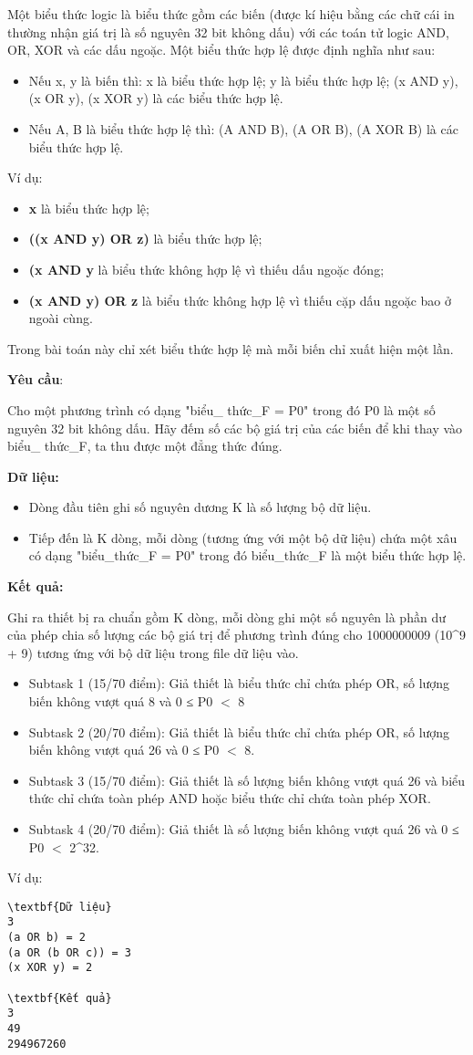 

Một biểu thức logic là biểu thức gồm các biến (được kí hiệu bằng các chữ cái in thường nhận giá trị là số nguyên 32 bit không dấu) với các toán tử logic AND, OR, XOR và các dấu ngoặc. Một biểu thức hợp lệ được định nghĩa như sau:
\begin{itemize}
	\item Nếu x, y là biến thì: x là biểu thức hợp lệ; y là biểu thức hợp lệ; (x AND y), (x OR y), (x XOR y) là các biểu thức hợp lệ.
	\item Nếu A, B là biểu thức hợp lệ thì: (A AND B), (A OR B), (A XOR B) là các biểu thức hợp lệ.
\end{itemize}

Ví dụ:
\begin{itemize}
	\item \textbf{x} là biểu thức hợp lệ;
	\item \textbf{((x AND y) OR z)} là biểu thức hợp lệ;
	\item \textbf{(x AND y} là biểu thức không hợp lệ vì thiếu dấu ngoặc đóng;
	\item \textbf{(x AND y) OR z} là biểu thức không hợp lệ vì thiếu cặp dấu ngoặc bao ở ngoài cùng.
\end{itemize}

Trong bài toán này chỉ xét biểu thức hợp lệ mà mỗi biến chỉ xuất hiện một lần.

\textbf{Yêu cầu}:

Cho một phương trình có dạng "biểu\_ thức\_F = P0" trong đó P0 là một số nguyên 32 bit không dấu. Hãy đếm số các bộ giá trị của các biến để khi thay vào biểu\_ thức\_F, ta thu được một đẳng thức đúng.

\textbf{Dữ liệu:} 
\begin{itemize}
	\item Dòng đầu tiên ghi số nguyên dương K là số lượng bộ dữ liệu.
	\item Tiếp đến là K dòng, mỗi dòng (tương ứng với một bộ dữ liệu) chứa một xâu có dạng "biểu\_thức\_F = P0" trong đó biểu\_thức\_F là một biểu thức hợp lệ.
\end{itemize}

\textbf{Kết quả:}

Ghi ra thiết bị ra chuẩn gồm K dòng, mỗi dòng ghi một số nguyên là phần dư của phép chia số lượng các bộ giá trị để phương trình đúng cho 1000000009 (10^9 + 9) tương ứng với bộ dữ liệu trong file dữ liệu vào.
\begin{itemize}
	\item Subtask 1 (15/70 điểm): Giả thiết là biểu thức chỉ chứa phép OR, số lượng biến không vượt quá 8 và 0 ≤ P0 $<$ 8
	\item Subtask 2 (20/70 điểm): Giả thiết là biểu thức chỉ chứa phép OR, số lượng biến không vượt quá 26 và 0 ≤ P0 $<$ 8.
	\item Subtask 3 (15/70 điểm): Giả thiết là số lượng biến không vượt quá 26 và biểu thức chỉ chứa toàn phép AND hoặc biểu thức chỉ chứa toàn phép XOR.
	\item Subtask 4 (20/70 điểm): Giả thiết là số lượng biến không vượt quá 26 và 0 ≤ P0 $<$ 2^32.
\end{itemize}

Ví dụ:
\begin{verbatim}
\textbf{Dữ liệu}
3
(a OR b) = 2
(a OR (b OR c)) = 3
(x XOR y) = 2

\textbf{Kết quả}
3
49
294967260\end{verbatim}

 
